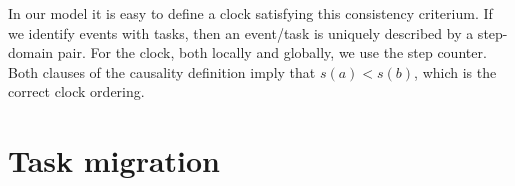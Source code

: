 \documentclass[11pt,fleqn,preprint]{impreport}
\begin{document}
In our model it is easy to define a clock satisfying this consistency
criterium. If we identify events with tasks, then an event/task
is uniquely described by a step-domain pair. For the clock,
both locally and globally, we use the step counter.
Both clauses of the causality definition imply that $s(a)<s(b)$,
which is the correct clock ordering.

\section{Task migration}




\end{document}
